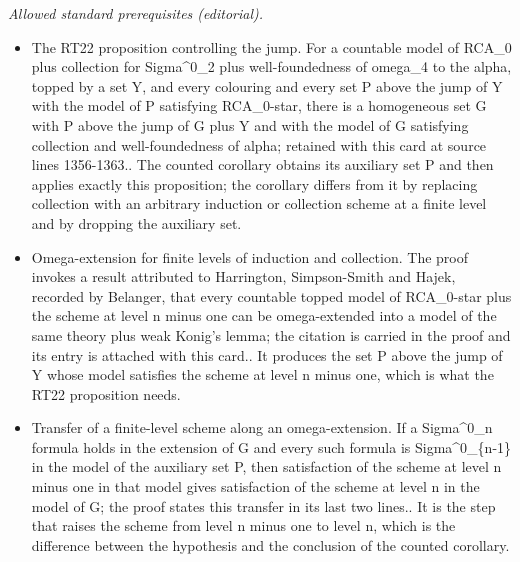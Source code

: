 \documentclass{article}
\numberwithin{theorem}{section}
\newtheorem{proposition}[theorem]{Proposition}
\newcommand{\RCA}{\mathsf{RCA}}
\newcommand{\BSig}{\mathsf{B}\Sigma^0}
\newcommand{\WF}{\mathsf{WF}}
\newcommand{\M}{\mathcal{M}}
\begin{document}
\noindent\textit{Allowed standard prerequisites (editorial).}\begin{itemize}
\item The RT22 proposition controlling the jump. For a countable model of RCA\_0 plus collection for Sigma\textasciicircum{}0\_2 plus well-foundedness of omega\_4 to the alpha, topped by a set Y, and every colouring and every set P above the jump of Y with the model of P satisfying RCA\_0-star, there is a homogeneous set G with P above the jump of G plus Y and with the model of G satisfying collection and well-foundedness of alpha; retained with this card at source lines 1356-1363.. The counted corollary obtains its auxiliary set P and then applies exactly this proposition; the corollary differs from it by replacing collection with an arbitrary induction or collection scheme at a finite level and by dropping the auxiliary set.
\item Omega-extension for finite levels of induction and collection. The proof invokes a result attributed to Harrington, Simpson-Smith and Hajek, recorded by Belanger, that every countable topped model of RCA\_0-star plus the scheme at level n minus one can be omega-extended into a model of the same theory plus weak Konig's lemma; the citation is carried in the proof and its entry is attached with this card.. It produces the set P above the jump of Y whose model satisfies the scheme at level n minus one, which is what the RT22 proposition needs.
\item Transfer of a finite-level scheme along an omega-extension. If a Sigma\textasciicircum{}0\_n formula holds in the extension of G and every such formula is Sigma\textasciicircum{}0\_\{n-1\} in the model of the auxiliary set P, then satisfaction of the scheme at level n minus one in that model gives satisfaction of the scheme at level n in the model of G; the proof states this transfer in its last two lines.. It is the step that raises the scheme from level n minus one to level n, which is the difference between the hypothesis and the conclusion of the counted corollary.
\end{itemize}\medskip
{}
\end{document}
